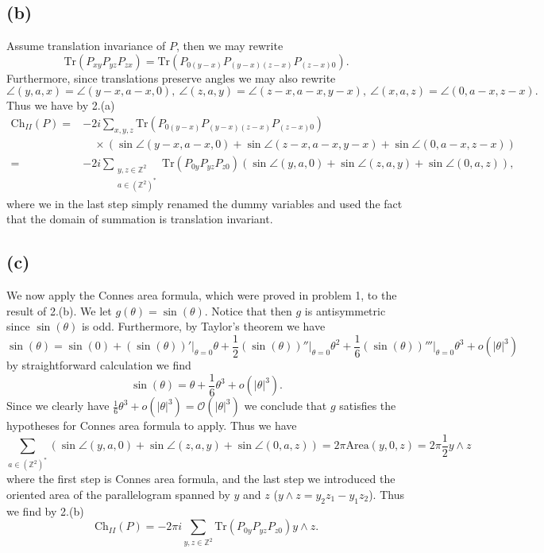 \documentclass[a4paper,11pt]{article}
\newcommand{\abs}[1]{\left\lvert #1 \right\rvert}
\newcommand{\trace}[1]{\text{Tr}\left(#1\right)}
\newcommand{\Z}{\mathbb{Z}}
\newcommand{\Area}{\text{Area}}
\numberwithin{equation}{section}
\begin{document}
\subsection*{(b)}
Assume translation invariance of $ P $, then we may rewrite\begin{equation}
\trace{P_{xy}P_{yz}P_{zx}}=\trace{P_{0(y-x)}P_{(y-x)(z-x)}P_{(z-x)0}}.
\end{equation}
Furthermore, since translations preserve angles we may also rewrite \begin{equation}
\angle(y,a,x)=\angle(y-x,a-x,0),\ \angle(z,a,y)=\angle(z-x,a-x,y-x),\ \angle(x,a,z)=\angle(0,a-x,z-x).
\end{equation}
Thus we have by 2.(a) \begin{equation}
\begin{aligned}
\text{Ch}_{II}(P)=&-2i\sum_{x,y,z}\trace{P_{0(y-x)}P_{(y-x)(z-x)}P_{(z-x)0}}\\&\quad\times\left(\sin\angle(y-x,a-x,0)+\sin\angle(z-x,a-x,y-x)+\sin\angle(0,a-x,z-x)\right)\\
=&-2i\sum_{\substack{y,z\in\Z^2\\ a\in(\Z^2)^*}}\trace{P_{0y}P_{yz}P_{z0}}\left(\sin\angle(y,a,0)+\sin\angle(z,a,y)+\sin\angle(0,a,z)\right),
\end{aligned}
\end{equation}
where we in the last step simply renamed the dummy variables and used the fact that the domain of summation is translation invariant.
\subsection*{(c)}
We now apply the Connes area formula, which were proved in problem 1, to the result of 2.(b). We let $ g(\theta)=\sin(\theta) $. Notice that then $ g $ is antisymmetric since $ \sin(\theta) $ is odd. Furthermore, by Taylor's theorem we have \begin{equation}
\sin(\theta)=\sin(0)+(\sin(\theta))'\rvert_{\theta=0}\theta+\frac{1}{2}(\sin(\theta))''\rvert_{\theta=0}\theta^2+\frac{1}{6}(\sin(\theta))'''\rvert_{\theta=0}\theta^3+o(\abs{\theta}^3)
\end{equation} 
by straightforward calculation we find\begin{equation}
\sin(\theta)=\theta+\frac{1}{6}\theta^3+o(\abs{\theta}^3).
\end{equation} 
Since we clearly have $ \frac{1}{6}\theta^3+o(\abs{\theta}^3)=\mathcal{O}(\abs{\theta}^3) $ we conclude that $ g $ satisfies the hypotheses for Connes area formula to apply. Thus we have \begin{equation}
\sum_{a\in(\Z^2)^*}\left(\sin\angle(y,a,0)+\sin\angle(z,a,y)+\sin\angle(0,a,z)\right)=2\pi \Area(y,0,z)=2\pi \frac{1}{2}y\wedge z
\end{equation} 
where the first step is Connes area formula, and the last step we introduced the oriented area of the parallelogram spanned by $ y $ and $ z $ ($ y\wedge z=y_2z_1-y_1z_2 $). Thus we find by 2.(b)\begin{equation}
\text{Ch}_{II}(P)=-2\pi i\sum_{y,z\in\Z^2}\trace{P_{0y}P_{yz}P_{z0}}y\wedge z.
\end{equation}
\end{document}
